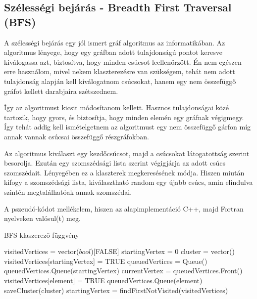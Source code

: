 \documentclass[a4paper,12pt]{article}
\begin{document}
\vspace{5mm}

\subsection{ Szélességi bejárás - Breadth First Traversal (BFS)}

\par A szélességi bejárás egy jól ismert gráf algoritmus az informatikában. Az algoritmus lényege, hogy egy gráfban adott tulajdonságú pontot keresve kiválogassa azt, biztosítva, hogy minden csúcsot leellenőrzött. Én nem egészen erre használom, mivel nekem klaszterezésre van szükségem, tehát nem adott tulajdonság alapján kell kiválogatnom csúcsokat, hanem egy nem összefüggő gráfot kellett darabjaira szétszednem.

\vspace{5mm}

\par Így az algoritmust kicsit módosítanom kellett. Hasznos tulajdonságai közé tartozik, hogy gyors, és biztosítja, hogy minden elemén egy gráfnak végigmegy. Így tehát addig kell ismételgetnem az algoritmust egy nem összefüggő gárfon míg annak vannak csúcsai összefüggő részgráfokban. 

\vspace{5mm}

\par Az algoritmus kiválaszt egy kezdőcsúcsot, majd a csúcsokat látogatottság szerint besorolja. Ezután egy szomszédsági lista szerint végigjárja az adott csúcs szomszédait. Lényegében ez a klaszterek megkeresésének módja. Hiszen miután kifogy a szomszédsági lista, kiválasztható random egy újabb csúcs, amin elindulva szintén megtalálhatóak annak szomszédai. 

\vspace{5mm}

\par A pszeudó-kódot mellékelem, hiszen az alapimplementáció C++, majd Fortran nyelveken valósul(t) meg.

\vspace{5mm}

\begin{center}
\begin{algorithm}
\caption{BFS klaszerező függvény}
\begin{algorithmic}
\STATE visitedVertices = vector($bool$)[FALSE]
\STATE startingVertex = 0
	\STATE cluster = vector()
	\STATE visitedVertices[startingVertex] = TRUE
	\STATE queuedVertices = Queue()
	\STATE queuedVertices.Queue(startingVertex)
		\STATE currentVertex = queuedVertices.Front()
				\STATE visitedVertices[element] = TRUE
				\STATE queuedVertices.Queue(element)
			\ENDIF
		\ENDFOR
	\STATE saveCluster(cluster)
	\STATE startingVertex = findFirstNotVisited(visitedVertices)
	\ENDWHILE
\ENDWHILE
\end{algorithmic}
\end{algorithm}
\end{center}
\end{document}
